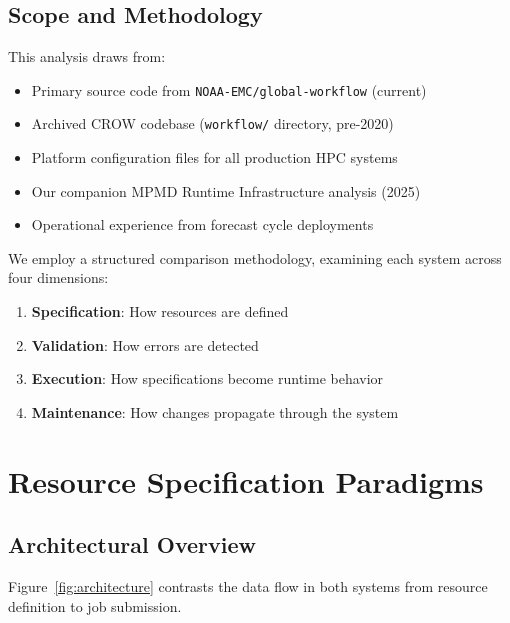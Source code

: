 \documentclass[11pt,twoside]{article}
\newcommand{\crow}{\textsc{CROW}}
\newcommand{\mpmd}{\textsc{MPMD}}
\begin{document}
\subsection{Scope and Methodology}

This analysis draws from:
\begin{itemize}[leftmargin=2em]
    \item Primary source code from \texttt{NOAA-EMC/global-workflow} (current)
    \item Archived \crow{} codebase (\texttt{workflow/} directory, pre-2020)
    \item Platform configuration files for all production HPC systems
    \item Our companion \mpmd{} Runtime Infrastructure analysis (2025)
    \item Operational experience from forecast cycle deployments
\end{itemize}

We employ a structured comparison methodology, examining each system across four dimensions:
\begin{enumerate}
    \item \textbf{Specification}: How resources are defined
    \item \textbf{Validation}: How errors are detected
    \item \textbf{Execution}: How specifications become runtime behavior
    \item \textbf{Maintenance}: How changes propagate through the system
\end{enumerate}

\section{Resource Specification Paradigms}
\label{sec:paradigms}

\subsection{Architectural Overview}

Figure~\ref{fig:architecture} contrasts the data flow in both systems from resource definition to job submission.
\end{document}
